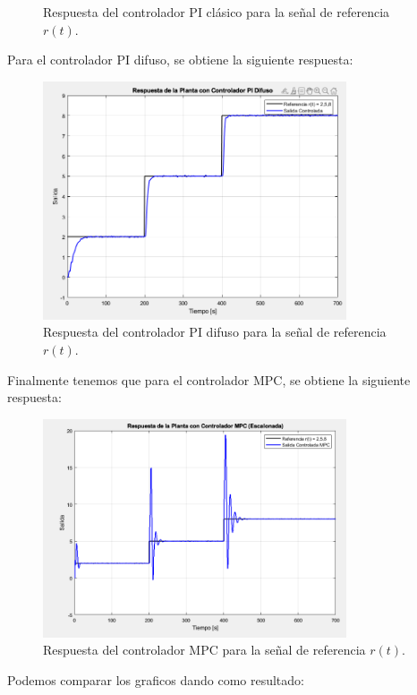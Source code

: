\begin{enumerate}
\begin{figure}
        \caption{Respuesta del controlador PI clásico para la señal de referencia \(r(t)\).}
        \label{fig:14}
    \end{figure}
    Para el controlador PI difuso, se obtiene la siguiente respuesta:
    \begin{figure}
        \centering
        \includegraphics[width=0.8\textwidth]{img/Figure_15}
        \caption{Respuesta del controlador PI difuso para la señal de referencia \(r(t)\).}
        \label{fig:15}
    \end{figure}
    Finalmente tenemos que para el controlador MPC, se obtiene la siguiente respuesta:
    \begin{figure}
        \centering
        \includegraphics[width=0.8\textwidth]{img/Figure_16}
        \caption{Respuesta del controlador MPC para la señal de referencia \(r(t)\).}
        \label{fig:16}
    \end{figure}
    Podemos comparar los graficos dando como resultado:
    \begin{figure}
        \centering

\end{figure}
\end{enumerate}
